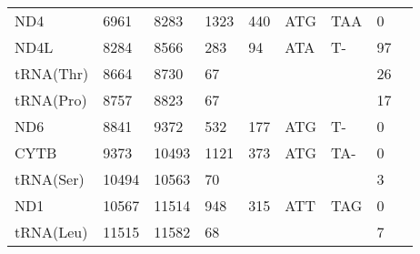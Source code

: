 \documentclass[../DISSERTACAO_MAIN.tex]{subfiles}
\begin{document}
\begin{longtable}{llllllllllllllllllllll}
			ND4          & \multicolumn{2}{l}{6961}    & \multicolumn{2}{l}{8283}    & \multicolumn{2}{l}{1323}        & \multicolumn{3}{l}{440}                       & \multicolumn{3}{l}{ATG}   & \multicolumn{3}{l}{TAA}     & \multicolumn{3}{l}{0}           & \multicolumn{3}{l}{}         \\
			ND4L         & \multicolumn{2}{l}{8284}    & \multicolumn{2}{l}{8566}    & \multicolumn{2}{l}{283}         & \multicolumn{3}{l}{94}                        & \multicolumn{3}{l}{ATA}   & \multicolumn{3}{l}{T-}      & \multicolumn{3}{l}{97}          & \multicolumn{3}{l}{}         \\
			tRNA(Thr)    & \multicolumn{2}{l}{8664}    & \multicolumn{2}{l}{8730}    & \multicolumn{2}{l}{67}          & \multicolumn{3}{l}{}                          & \multicolumn{3}{l}{}      & \multicolumn{3}{l}{}        & \multicolumn{3}{l}{26}          & \multicolumn{3}{l}{}         \\
			tRNA(Pro)    & \multicolumn{2}{l}{8757}    & \multicolumn{2}{l}{8823}    & \multicolumn{2}{l}{67}          & \multicolumn{3}{l}{}                          & \multicolumn{3}{l}{}      & \multicolumn{3}{l}{}        & \multicolumn{3}{l}{17}          & \multicolumn{3}{l}{}         \\
			ND6          & \multicolumn{2}{l}{8841}    & \multicolumn{2}{l}{9372}    & \multicolumn{2}{l}{532}         & \multicolumn{3}{l}{177}                       & \multicolumn{3}{l}{ATG}   & \multicolumn{3}{l}{T-}      & \multicolumn{3}{l}{0}           & \multicolumn{3}{l}{}         \\
			CYTB         & \multicolumn{2}{l}{9373}    & \multicolumn{2}{l}{10493}   & \multicolumn{2}{l}{1121}        & \multicolumn{3}{l}{373}                       & \multicolumn{3}{l}{ATG}   & \multicolumn{3}{l}{TA-}     & \multicolumn{3}{l}{0}           & \multicolumn{3}{l}{}         \\
			tRNA(Ser)    & \multicolumn{2}{l}{10494}   & \multicolumn{2}{l}{10563}   & \multicolumn{2}{l}{70}          & \multicolumn{3}{l}{}                          & \multicolumn{3}{l}{}      & \multicolumn{3}{l}{}        & \multicolumn{3}{l}{3}           & \multicolumn{3}{l}{}         \\
			ND1          & \multicolumn{2}{l}{10567}   & \multicolumn{2}{l}{11514}   & \multicolumn{2}{l}{948}         & \multicolumn{3}{l}{315}                       & \multicolumn{3}{l}{ATT}   & \multicolumn{3}{l}{TAG}     & \multicolumn{3}{l}{0}           & \multicolumn{3}{l}{}         \\
			tRNA(Leu)    & \multicolumn{2}{l}{11515}   & \multicolumn{2}{l}{11582}   & \multicolumn{2}{l}{68}          & \multicolumn{3}{l}{}                          & \multicolumn{3}{l}{}      & \multicolumn{3}{l}{}        & \multicolumn{3}{l}{7}           & \multicolumn{3}{l}{}         \\

\end{longtable}
\end{document}
